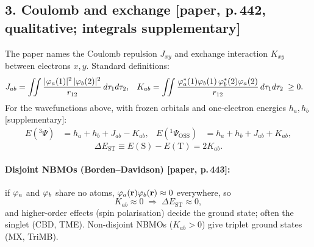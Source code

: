 \subsection*{3. Coulomb and exchange [paper, p.\,442, qualitative; integrals supplementary]}
The paper names the Coulomb repulsion $J_{xy}$ and exchange interaction $K_{xy}$ between electrons
$x,y$. Standard definitions:
\begin{align}
  J_{ab} &= \iint \frac{|\varphi_a(1)|^2\,|\varphi_b(2)|^2}{r_{12}}\,d\tau_1 d\tau_2, &
  K_{ab} &= \iint \frac{\varphi_a^*(1)\varphi_b(1)\,\varphi_b^*(2)\varphi_a(2)}{r_{12}}\,d\tau_1 d\tau_2 \;\ge 0 .
\end{align}
For the wavefunctions above, with frozen orbitals and one-electron energies $h_a,h_b$
[supplementary]:
\begin{align}
  E({}^3\Psi) &= h_a + h_b + J_{ab} - K_{ab}, &
  E({}^1\Psi_{\text{OSS}}) &= h_a + h_b + J_{ab} + K_{ab},
\end{align}
\begin{equation}
  \Delta E_{\mathrm{ST}} \equiv E(\mathrm{S}) - E(\mathrm{T}) = 2K_{ab}.
\end{equation}

\paragraph{Disjoint NBMOs (Borden--Davidson) [paper, p.\,443]:} if $\varphi_a$ and $\varphi_b$ share no
atoms, $\varphi_a(\mathbf r)\varphi_b(\mathbf r)\approx0$ everywhere, so
\begin{equation}
  K_{ab}\approx 0 \;\Rightarrow\; \Delta E_{\mathrm{ST}}\approx 0,
\end{equation}
and higher-order effects (spin polarisation) decide the ground state; often the singlet
(CBD, TME). Non-disjoint NBMOs ($K_{ab}>0$) give triplet ground states (MX, TriMB).

